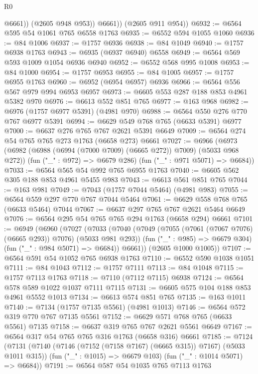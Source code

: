 \begin{lexlean}{R0}
\begin{coremodule}
                @6661))
            (@2605 @948 @953))
          @6661))
      (@2605 @911 @954))
@6932 := @6564 @595 @54 @1061 @765 @6558 @1763
@6935 := @6552 @594 @1055 @1060
@6936 := @84 @1006
@6937 := @1757 @6936
@6938 := @84 @1049
@6940 := @1757 @6938 @1763
@6943 := @6935 (@6937 @6940) @6558
@6949 := @6564 @569 @593 @1009 @1054 @6936 @6940
@6952 := @6552 @568 @995 @1008
@6953 := @84 @1000
@6954 := @1757 @6953
@6955 := @84 @1005
@6957 := @1757 @6955 @1763
@6960 := @6952 (@6954 @6957) @6936
@6966 := @6564 @556 @567 @979 @994 @6953 @6957
@6973 := @6605 @553 @287 @188 @853 @4961 @5382 @970
@6976 := @6613 @552 @851 @765
@6977 := @163 @968
@6982 := @6976 (@1757 @6977 @5391) (@4981 @970)
@6988 := @6564 @550 @276 @770 @767 @6977 @5391
@6994 := @6629 @549 @768 @765 (@6633 @5391) @6977
@7000 := @6637 @276 @765 @767 @2621 @5391 @6649
@7009 := @6564 @274 @54 @765 @765 @273 @1763 (@6658 @273) @6661
@7027 := @6966
    (@6973
      (@6982 (@6988 (@6994 (@7000 @7009) (@6665 @272)) @7009) (@5033 @968 @272))
      (fun ("_" : @972) => @6679 @286)
      (fun ("_" : @971 @5071) => @6684))
@7033 := @6564 @565 @54 @992 @765 @6955 @1763
@7040 := @6605 @562 @305 @188 @853 @4961 @5455 @983
@7043 := @6613 @561 @851 @765
@7044 := @163 @981
@7049 := @7043 (@1757 @7044 @5464) (@4981 @983)
@7055 := @6564 @559 @297 @770 @767 @7044 @5464
@7061 := @6629 @558 @768 @765 (@6633 @5464) @7044
@7067 := @6637 @297 @765 @767 @2621 @5464 @6649
@7076 := @6564 @295 @54 @765 @765 @294 @1763 (@6658 @294) @6661
@7101 := @6949
    (@6960
      (@7027
        (@7033
          (@7040
            (@7049 (@7055 (@7061 (@7067 @7076) (@6665 @293)) @7076) (@5033 @981 @293))
            (fun ("_" : @985) => @6679 @304)
            (fun ("_" : @984 @5071) => @6684))
          @6661))
      (@2605 @1000 @1005))
@7107 := @6564 @591 @54 @1052 @765 @6938 @1763
@7110 := @6552 @590 @1038 @1051
@7111 := @84 @1043
@7112 := @1757 @7111
@7113 := @84 @1048
@7115 := @1757 @7113 @1763
@7118 := @7110 (@7112 @7115) @6938
@7124 := @6564 @578 @589 @1022 @1037 @7111 @7115
@7131 := @6605 @575 @104 @188 @853 @4961 @5552 @1013
@7134 := @6613 @574 @851 @765
@7135 := @163 @1011
@7140 := @7134 (@1757 @7135 @5561) (@4981 @1013)
@7146 := @6564 @572 @319 @770 @767 @7135 @5561
@7152 := @6629 @571 @768 @765 (@6633 @5561) @7135
@7158 := @6637 @319 @765 @767 @2621 @5561 @6649
@7167 := @6564 @317 @54 @765 @765 @316 @1763 (@6658 @316) @6661
@7185 := @7124
    (@7131
      (@7140 (@7146 (@7152 (@7158 @7167) (@6665 @315)) @7167) (@5033 @1011 @315))
      (fun ("_" : @1015) => @6679 @103)
      (fun ("_" : @1014 @5071) => @6684))
@7191 := @6564 @587 @54 @1035 @765 @7113 @1763

\end{coremodule}
\end{lexlean}
